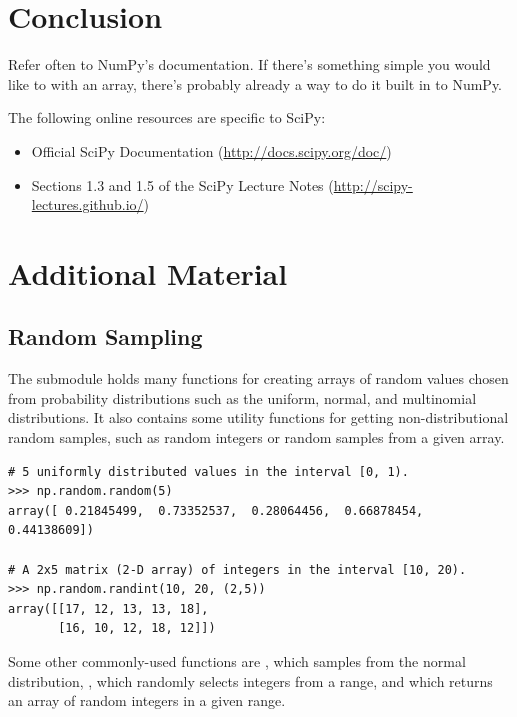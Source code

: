 \section*{Conclusion} %

Refer often to NumPy's documentation.
If there's something simple you would like to with an array, there's probably already a way to do it built in to NumPy.

The following online resources are specific to SciPy:
\begin{itemize}
\item Official SciPy Documentation (\url{http://docs.scipy.org/doc/})
\item Sections 1.3 and 1.5 of the SciPy Lecture Notes (\url{http://scipy-lectures.github.io/})
\end{itemize}

\newpage

\section*{Additional Material} %

\subsection*{Random Sampling} %

The submodule  holds many functions for creating arrays of random values chosen from probability distributions such as the uniform, normal, and multinomial distributions.
It also contains some utility functions for getting non-distributional random samples, such as random integers or random samples from a given array.


\begin{lstlisting}
# 5 uniformly distributed values in the interval [0, 1).
>>> np.random.random(5)
array([ 0.21845499,  0.73352537,  0.28064456,  0.66878454,  0.44138609])

# A 2x5 matrix (2-D array) of integers in the interval [10, 20).
>>> np.random.randint(10, 20, (2,5))
array([[17, 12, 13, 13, 18],
       [16, 10, 12, 18, 12]])
\end{lstlisting}

Some other commonly-used functions are , which samples from the normal distribution, , which randomly selects integers from a range, and  which returns an array of random integers in a given range.

